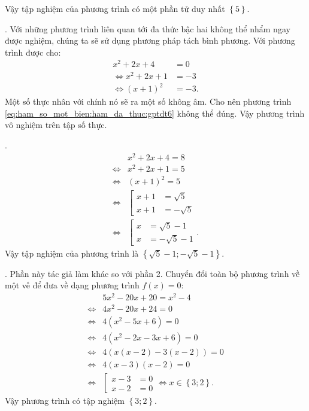 Vậy tập nghiệm của phương trình có một phần tử duy nhất $\displaystyle\left\{5\right\}$.

. Với những phương trình liên quan tới đa thức bậc hai không thể nhẩm ngay được nghiệm, chúng ta sẽ sử dụng phương pháp tách bình phương. Với phương trình được cho:
\begin{align}
   x^2 + 2x + 4 &= 0 \nonumber\\ 
   \iff x^2 + 2x + 1 &= -3 \nonumber\\
   \iff (x + 1)^2 &= -3. \label{eq:ham_so_mot_bien:ham_da_thuc:gptdt6}
\end{align}
Một số thực nhân với chính nó sẽ ra một số không âm. Cho nên phương trình \ref{eq:ham_so_mot_bien:ham_da_thuc:gptdt6} không thể đúng. Vậy phương trình vô nghiệm trên tập số thực.

. 
\begin{align*}
   &x^2 + 2x + 4 = 8 \\ 
   \iff &x^2 + 2x + 1 = 5 \\
   \iff &(x + 1)^2 = 5 \\
   \iff &\left[
      \begin{aligned}
         x + 1 &= \sqrt{5} \\
         x + 1 &= -\sqrt{5}
      \end{aligned}
   \right. \\
   \iff &\left[
      \begin{aligned}
         x &= \sqrt{5} - 1 \\
         x &= -\sqrt{5} - 1
      \end{aligned}
   \right..
\end{align*}
Vậy tập nghiệm của phương trình là $\displaystyle\left\{\sqrt{5} - 1; -\sqrt{5} - 1\right\}$.

. Phần này tác giả làm khác so với phần 2. Chuyển đổi toàn bộ phương trình về một vế để đưa về dạng phương trình $f(x) = 0$:
\begin{align*}
   &5x^2 - 20x + 20 = x^2 - 4 \\
   \iff &4x^2 - 20x + 24 = 0 \\
   \iff &4\left(x^2 - 5x + 6\right) = 0 \\
   \iff &4\left(x^2 - 2x - 3x + 6\right) = 0 \\
   \iff &4\left(x(x - 2) - 3(x - 2)\right) = 0 \\
   \iff &4(x - 3)(x - 2) = 0 \\
   \iff &\left[
      \begin{aligned}
         x - 3 &= 0 \\
         x - 2 &= 0
      \end{aligned}
   \right. \iff x \in \left\{3; 2\right\}. 
\end{align*}
Vậy phương trình có tập nghiệm $\left\{3; 2\right\}$.

